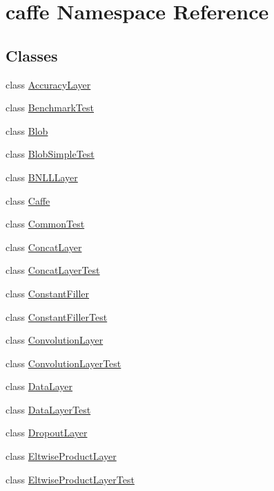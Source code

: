 \hypertarget{namespacecaffe}{\section{caffe Namespace Reference}
\label{namespacecaffe}
}
\subsection*{Classes}
\begin{DoxyCompactItemize}
\item 
class \hyperlink{classcaffe_1_1_accuracy_layer}{Accuracy\+Layer}
\item 
class \hyperlink{classcaffe_1_1_benchmark_test}{Benchmark\+Test}
\item 
class \hyperlink{classcaffe_1_1_blob}{Blob}
\item 
class \hyperlink{classcaffe_1_1_blob_simple_test}{Blob\+Simple\+Test}
\item 
class \hyperlink{classcaffe_1_1_b_n_l_l_layer}{B\+N\+L\+L\+Layer}
\item 
class \hyperlink{classcaffe_1_1_caffe}{Caffe}
\item 
class \hyperlink{classcaffe_1_1_common_test}{Common\+Test}
\item 
class \hyperlink{classcaffe_1_1_concat_layer}{Concat\+Layer}
\item 
class \hyperlink{classcaffe_1_1_concat_layer_test}{Concat\+Layer\+Test}
\item 
class \hyperlink{classcaffe_1_1_constant_filler}{Constant\+Filler}
\item 
class \hyperlink{classcaffe_1_1_constant_filler_test}{Constant\+Filler\+Test}
\item 
class \hyperlink{classcaffe_1_1_convolution_layer}{Convolution\+Layer}
\item 
class \hyperlink{classcaffe_1_1_convolution_layer_test}{Convolution\+Layer\+Test}
\item 
class \hyperlink{classcaffe_1_1_data_layer}{Data\+Layer}
\item 
class \hyperlink{classcaffe_1_1_data_layer_test}{Data\+Layer\+Test}
\item 
class \hyperlink{classcaffe_1_1_dropout_layer}{Dropout\+Layer}
\item 
class \hyperlink{classcaffe_1_1_eltwise_product_layer}{Eltwise\+Product\+Layer}
\item 
class \hyperlink{classcaffe_1_1_eltwise_product_layer_test}{Eltwise\+Product\+Layer\+Test}
\item 

\end{DoxyCompactItemize}
